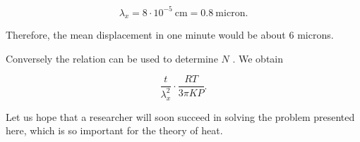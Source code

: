 \documentclass{article}
\begin{document}
\[\lambda_{x} = 8 \cdot 10^{-5} \: \mathrm{cm} = 0.8 \: \mathrm{micron}. \]

\noindent Therefore, the mean displacement in one minute would be about 6 microns.

Conversely the relation can be used to determine $N$ . We obtain

\[\frac{t}{\lambda^{2}_{x}} \cdot \frac{RT}{3\pi KP}.\]

Let us hope that a researcher will soon succeed in solving the problem presented here, which is so
important for the theory of heat.
\end{document}

